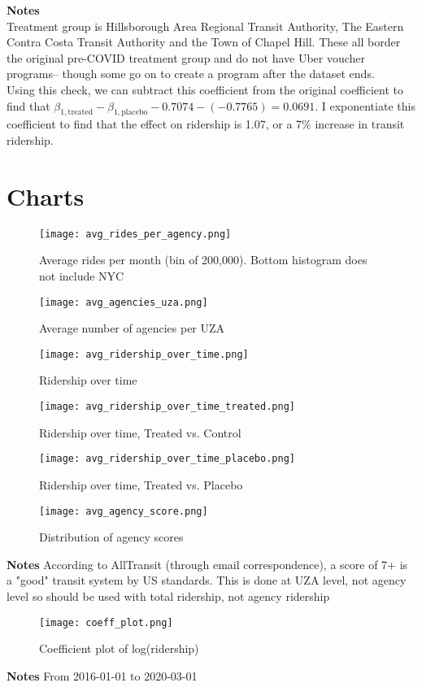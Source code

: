 \documentclass [11pt]{article}
\begin{document}
\textbf{Notes}\\
Treatment group is Hillsborough Area Regional Transit Authority, The Eastern Contra Costa Transit Authority and the Town of Chapel Hill. These all border the original pre-COVID treatment group and do not have Uber voucher programs-- though some go on to create a program after the dataset ends. \\
\indent Using this check, we can subtract this coefficient from the original coefficient to find that $\beta_{1,\text{treated}} - \beta_{1,\text{placebo}}-0.7074 - (-0.7765)= 0.0691$. I exponentiate this coefficient to find that the effect on ridership is 1.07, or a 7\% increase in transit ridership.

\newpage
\section*{Charts}
\begin{figure}[H]
    \centering
    \texttt{[image: avg\_rides\_per\_agency.png]} %
    \caption{Average rides per month (bin of 200,000). Bottom histogram does not include NYC}
\end{figure}
\begin{figure}[H]
    \centering
    \texttt{[image: avg\_agencies\_uza.png]} %
    \caption{Average number of agencies per UZA}
\end{figure}
\begin{figure}[H]
    \centering
    \texttt{[image: avg\_ridership\_over\_time.png]} %
    \caption{Ridership over time}
\end{figure}
\begin{figure}[H]
    \centering
    \texttt{[image: avg\_ridership\_over\_time\_treated.png]} %
    \caption{Ridership over time, Treated vs. Control}
\end{figure}
\begin{figure}[H]
    \centering
    \texttt{[image: avg\_ridership\_over\_time\_placebo.png]} %
    \caption{Ridership over time, Treated vs. Placebo}
\end{figure}
\begin{figure}[H]
    \centering
    \texttt{[image: avg\_agency\_score.png]} %
    \caption{Distribution of agency scores}
\end{figure}
\textbf{Notes}
According to AllTransit (through email correspondence), a score of 7+ is a "good" transit system by US standards. This is done at UZA level, not agency level so should be used with total ridership, not agency ridership
\begin{figure}[H]
    \centering
    \texttt{[image: coeff\_plot.png]} %
    \caption{Coefficient plot of log(ridership)}
\end{figure}
\textbf{Notes}
From 2016-01-01 to 2020-03-01
\end{document}
